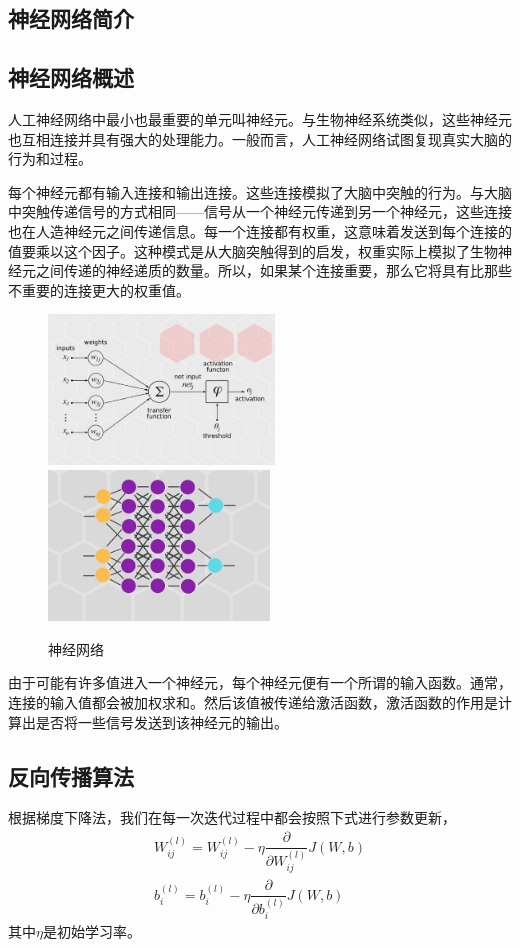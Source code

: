\documentclass[supercite]{HustGraduPaper}
\begin{document}
\begin{sloppypar}
\begin{appendices}
    \section{神经网络简介}
    \subsection{神经网络概述}
    人工神经网络中最小也最重要的单元叫神经元。与生物神经系统类似，这些神经元也互相连接并具有强大的处理能力。一般而言，人工神经网络试图复现真实大脑的行为和过程。

    每个神经元都有输入连接和输出连接。这些连接模拟了大脑中突触的行为。与大脑中突触传递信号的方式相同——信号从一个神经元传递到另一个神经元，这些连接也在人造神经元之间传递信息。每一个连接都有权重，这意味着发送到每个连接的值要乘以这个因子。这种模式是从大脑突触得到的启发，权重实际上模拟了生物神经元之间传递的神经递质的数量。所以，如果某个连接重要，那么它将具有比那些不重要的连接更大的权重值。\begin{figure}[H]
      \setlength{\abovecaptionskip}{0.2cm}
      \setlength{\belowcaptionskip}{-0.2cm}
      \centering%
        {\includegraphics[height=4cm]{20.jpg}}%
      \hspace{2em}%
          {\includegraphics[height=4cm]{21.jpg}}
      \caption{神经网络}
      \end{figure}
    由于可能有许多值进入一个神经元，每个神经元便有一个所谓的输入函数。通常，连接的输入值都会被加权求和。然后该值被传递给激活函数，激活函数的作用是计算出是否将一些信号发送到该神经元的输出。
    \subsection{反向传播算法}
    根据梯度下降法，我们在每一次迭代过程中都会按照下式进行参数更新，\begin{gather}
      W^{(l)}_{ij}=W^(l)_{ij}-\eta\dfrac{\partial}{\partial W^{(l)}_{ij}}J(W,b)\\
      b^{(l)}_{i}=b^{(l)}_{i}-\eta\dfrac{\partial}{\partial b^{(l)}_{i}}J(W,b)
    \end{gather}
    其中$\eta$是初始学习率。


\end{appendices}
\end{sloppypar}
\end{document}
